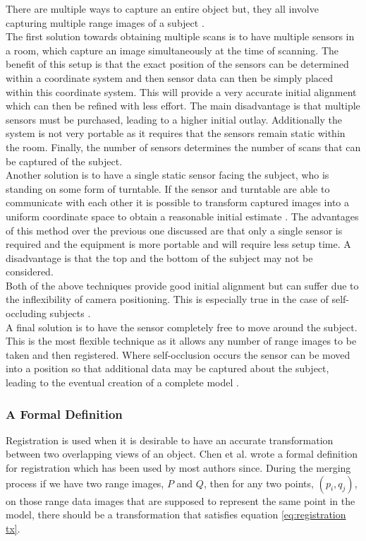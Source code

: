 There are multiple ways to capture an entire object but, they all involve capturing multiple range images of a subject \cite{bernardini2002}. \\

The first solution towards obtaining multiple scans is to have multiple sensors in a room, which capture an image simultaneously at the time of scanning. The benefit of this setup is that the exact position of the sensors can be determined within a coordinate system and then sensor data can then be simply placed within this coordinate system. This will provide a very accurate initial alignment which can then be refined with less effort. The main disadvantage is that multiple sensors must be purchased, leading to a higher initial outlay. Additionally the system is not very portable as it requires that the sensors remain static within the room. Finally, the number of sensors determines the number of scans that can be captured of the subject. \\

Another solution is to have a single static sensor facing the subject, who is standing on some form of turntable. If the sensor and turntable are able to communicate with each other it is possible to transform captured images into a uniform coordinate space to obtain a reasonable initial estimate \cite{turk94}. The advantages of this method over the previous one discussed are that only a single sensor is required and the equipment is more portable and will require less setup time. A disadvantage is that the top and the bottom of the subject may not be considered. \\

Both of the above techniques provide good initial alignment but can suffer due to the inflexibility of camera positioning. This is especially true in the case of self-occluding subjects \cite{bernardini2002}. \\

A final solution is to have the sensor completely free to move around the subject. This is the most flexible technique as it allows any number of range images to be taken and then registered. Where self-occlusion occurs the sensor can be moved into a position so that additional data may be captured about the subject, leading to the eventual creation of a complete model \cite{bernardini2002}. \\

\subsubsection{A Formal Definition}
Registration is used when it is desirable to have an accurate transformation between two overlapping views of an object. Chen et al. \cite{chen92} wrote a formal definition for registration which has been used by most authors since. During the merging process if we have two range images, $P$ and $Q$, then for any two points, $(p_i, q_j)$, on those range data images that are supposed to represent the same point in the model, there should be a transformation that satisfies equation \ref{eq:registration tx}. \\

